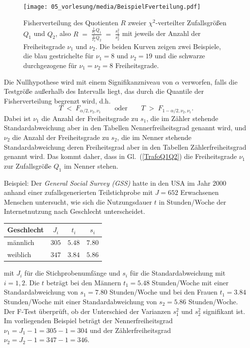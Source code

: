 \begin{figure}
\begin{center}
\texttt{[image: 05\_vorlesung/media/BeispielFverteilung.pdf]}
\caption{\label{Fverteilbeispiel}Fisherverteilung des Quotienten $R$
zweier $\chi^2$-verteilter Zufallsgrößen $Q_1$ und $Q_2$, also
$R \; = \; \frac{\frac{1}{\nu_1} Q_1}{\frac{1}{\nu_2} Q_2} \;
= \; \frac{s_1^2}{s_2^2}$ mit jeweils der Anzahl der Freiheitsgrade
$\nu_1$ und $\nu_2$. Die beiden Kurven zeigen zwei Beispiele, die
blau gestrichelte für $\nu_1 = 8$ und $\nu_2 = 19$ und die schwarze durchgezogene
für $\nu_1 = \nu_2 = 8$ Freiheitsgrade.}
\end{center}
\end{figure}



Die Nullhypothese wird mit einem Signifikanzniveau von $\alpha$
verworfen, falls die Testgröße außerhalb des Intervalls liegt,
das durch die Quantile der Fisherverteilung begrenzt wird, d.h.
\begin{equation}
T \; < \; F_{\alpha/2, \nu_2, \nu_1}  \qquad \mathrm{oder} \qquad
T \; > \; F_{1-\alpha/2, \nu_2, \nu_1} .
\end{equation}
Dabei ist $\nu_1$ die Anzahl der Freiheitsgrade zu $s_1$, die
im Zähler stehende Standardabweichung
aber in den Tabellen Nennerfreiheitsgrad genannt wird, und $\nu_2$
die Anzahl der Freiheitsgrade zu $s_2$, die im Nenner stehende
Standardabweichung deren Freiheitsgrad
aber in den Tabellen Zählerfreiheitsgrad genannt wird. Das kommt
daher, dass in Gl.~(\ref{TrafoQ1Q2}) die Freiheitsgrade $\nu_1$ zur
Zufallsgröße $Q_1$ im Nenner stehen.

Beispiel:
Der \textsl{General Social Survey (GSS)} hatte in den USA im Jahr 2000 anhand einer
zufallsgenerierten Teilstichprobe mit $J = 652$ Erwachsenen Menschen untersucht,
wie sich die Nutzungsdauer $t$ in Stunden/Woche der Internetnutzung nach Geschlecht unterscheidet.

\begin{center}
\begin{tabular}{l|ccc}
Geschlecht & $J_i$ & $t_i$ & $s_i$\\
\hline\hline
männlich & $305$ & $5.48$ & $7.80$\\
\hline
weiblich & $347$ & $3.84$ & $5.86$
\end{tabular}
\end{center}

mit $J_i$ für die Stichprobenumfänge und $s_i$ für die Standardabweichung mit $i = 1,2$.
Die $t$ beträgt bei den Männern $t_1 = 5.48$  Stunden/Woche
mit einer Standardabweichung von
$s_1 = 7.80$ Stunden/Woche und bei den Frauen
$t_1 = 3.84$  Stunden/Woche mit einer Standardabweichung von $s_2 = 5.86$ Stunden/Woche.
Der F-Test überprüft, ob der Unterschied der Varianzen $s_1^2$ und $s_2^2$ signifikant ist.
Im vorliegenden Beispiel beträgt der Nennerfreiheitsgrad $\nu_1 = J_1 - 1 = 305-1 = 304$ und der
Zählerfreiheitsgrad $\nu_2 = J_2 - 1 = 347-1 = 346$.


